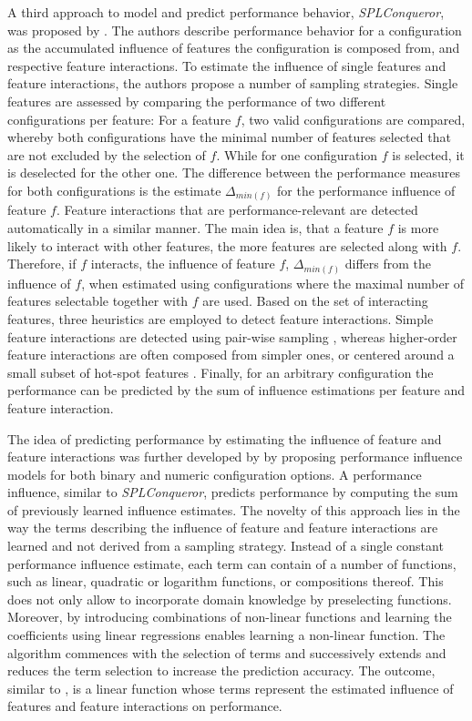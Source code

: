 A third approach to model and predict performance behavior,
\emph{SPLConqueror}, was proposed by \cite{siegmund_predicting_2012}. The
authors describe performance behavior  for a configuration as the accumulated influence of
features the configuration is composed from, and respective feature
interactions. To estimate the influence of single features and feature
interactions, the authors propose a number of sampling strategies. Single
features are assessed by comparing the performance of two different
configurations per feature: For a feature $f$, two valid configurations are
compared, whereby both configurations have the minimal number of features
selected that are not excluded by the selection of $f$. While for one
configuration $f$ is selected, it is deselected for the other one. The
difference between the performance measures for both configurations is the estimate
$\Delta_{min(f)}$ for the performance influence of feature $f$. Feature
interactions that are performance-relevant are detected automatically in a similar manner. The
main idea is, that a feature $f$ is more likely to interact with other features,
the more features are selected along with $f$. Therefore, if $f$ interacts, the
influence of feature $f$,  $\Delta_{min(f)}$ differs from the influence of $f$,
when estimated using configurations where the maximal number of features selectable
together with $f$ are used. Based on the set of interacting features, three
heuristics are employed to detect feature interactions. Simple feature
interactions are detected using pair-wise sampling
\citep{siegmund_predicting_2012,apel_feature-oriented_2013}, whereas
higher-order feature interactions are often composed from simpler ones, or centered
around a small subset of hot-spot features \citep{siegmund_predicting_2012}.
Finally, for an arbitrary configuration the performance can be predicted by the sum of influence
estimations per feature and feature interaction.

The idea of predicting performance by estimating the influence of feature
and feature interactions was further developed by \cite{siegmund_performance-influence_2015} by
proposing performance influence models for both binary and numeric
configuration options. A performance influence, similar to \emph{SPLConqueror},
predicts performance by computing the sum of previously learned influence
estimates. The novelty of this approach lies in the way the terms describing
the influence of feature and feature interactions are learned and not
derived from a sampling strategy.
Instead of a single constant performance influence estimate, each term can contain of a
number of functions, such as linear, quadratic or logarithm functions, or
compositions thereof. This does not only allow to incorporate domain knowledge
by preselecting functions. Moreover, by introducing combinations of non-linear
functions and learning the coefficients using linear regressions enables
learning a non-linear function. The algorithm commences with the selection of
terms and successively extends and reduces the term selection to increase 
the prediction accuracy. The outcome, similar to
\cite{siegmund_predicting_2012}, is a linear function whose terms represent the estimated influence of features and
feature interactions on performance.

